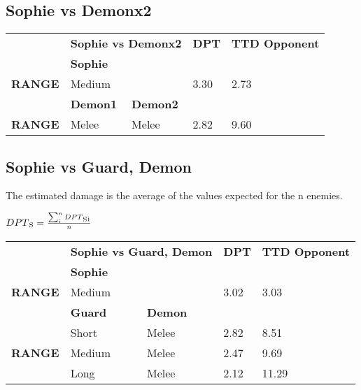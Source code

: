\subsection{Sophie vs Demonx2}
\begin{table}[H]
  \centering
\begin{tabular}{ll|l|l|l|}
\cline{2-5}
\multicolumn{1}{l|}{} & \multicolumn{2}{c|}{\cellcolor[HTML]{C0C0C0}\textbf{Sophie vs Demonx2}} & \cellcolor[HTML]{C0C0C0}\textbf{DPT} & \cellcolor[HTML]{C0C0C0}\textbf{TTD Opponent} \\ \cline{2-5} 
\multicolumn{1}{l|}{\textbf{}} & \multicolumn{2}{l|}{\textbf{Sophie}} & \multicolumn{2}{l|}{} \\ \hline
\multicolumn{1}{|l|}{\cellcolor[HTML]{C0C0C0}\textbf{RANGE}} & \multicolumn{2}{l|}{Medium} & 3.30 & 2.73 \\ \hline
\multicolumn{1}{l|}{} & \textbf{Demon1} & \textbf{Demon2} & \multicolumn{2}{l|}{} \\ \hline
\multicolumn{1}{|l|}{\cellcolor[HTML]{C0C0C0}\textbf{RANGE}} & Melee & Melee & 2.82 & 9.60 \\ \hline
\end{tabular}
\end{table}

\subsection{Sophie vs Guard, Demon}
The estimated damage is the average of the values ​​expected for the n enemies.
\begin{center}
 $DPT\textsubscript{S}=\frac{\sum_{i}^{n} DPT\textsubscript{S}\textsubscript{i}}{n}$
\end{center}

\begin{table}[H]
  \centering
\begin{tabular}{ll|l|l|l|}
\cline{2-5}
\multicolumn{1}{l|}{} & \multicolumn{2}{c|}{\cellcolor[HTML]{C0C0C0}\textbf{Sophie vs Guard, Demon}} & \cellcolor[HTML]{C0C0C0}\textbf{DPT} & \cellcolor[HTML]{C0C0C0}\textbf{TTD Opponent} \\ \cline{2-5} 
\multicolumn{1}{l|}{\textbf{}} & \multicolumn{2}{l|}{\textbf{Sophie}} & \multicolumn{2}{l|}{} \\ \hline
\multicolumn{1}{|l|}{\cellcolor[HTML]{C0C0C0}\textbf{RANGE}} & \multicolumn{2}{l|}{Medium} & 3.02 & 3.03 \\ \hline
\multicolumn{1}{l|}{} & \textbf{Guard} & \textbf{Demon} & \multicolumn{2}{l|}{} \\ \hline
\multicolumn{1}{|l|}{\cellcolor[HTML]{C0C0C0}} & Short & Melee & 2.82 & 8.51 \\ \cline{2-5} 
\multicolumn{1}{|l|}{\cellcolor[HTML]{C0C0C0}\textbf{RANGE}} & Medium & Melee & 2.47 & 9.69 \\ \cline{2-5} 
\multicolumn{1}{|l|}{\cellcolor[HTML]{C0C0C0}} & Long & Melee & 2.12 & 11.29 \\ \hline
\end{tabular}
\end{table}

